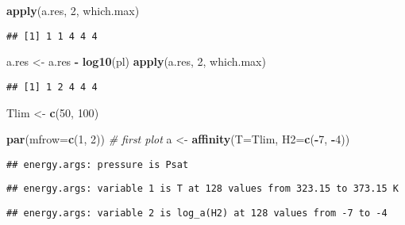 \documentclass[]{article}
\newenvironment{Shaded}{\begin{snugshade}}{\end{snugshade}}
\newcommand{\KeywordTok}[1]{\textcolor[rgb]{0.13,0.29,0.53}{\textbf{#1}}}
\newcommand{\DataTypeTok}[1]{\textcolor[rgb]{0.13,0.29,0.53}{#1}}
\newcommand{\DecValTok}[1]{\textcolor[rgb]{0.00,0.00,0.81}{#1}}
\newcommand{\StringTok}[1]{\textcolor[rgb]{0.31,0.60,0.02}{#1}}
\newcommand{\CommentTok}[1]{\textcolor[rgb]{0.56,0.35,0.01}{\textit{#1}}}
\newcommand{\OperatorTok}[1]{\textcolor[rgb]{0.81,0.36,0.00}{\textbf{#1}}}
\newcommand{\NormalTok}[1]{#1}
\begin{document}
\begin{Shaded}
\begin{Highlighting}[]
\KeywordTok{apply}\NormalTok{(a.res, }\DecValTok{2}\NormalTok{, which.max)}
\end{Highlighting}
\end{Shaded}

\begin{verbatim}
## [1] 1 1 4 4 4
\end{verbatim}

\begin{Shaded}
\begin{Highlighting}[]
\NormalTok{a.res <-}\StringTok{ }\NormalTok{a.res }\OperatorTok{-}\StringTok{ }\KeywordTok{log10}\NormalTok{(pl)}
\KeywordTok{apply}\NormalTok{(a.res, }\DecValTok{2}\NormalTok{, which.max)}
\end{Highlighting}
\end{Shaded}

\begin{verbatim}
## [1] 1 2 4 4 4
\end{verbatim}

\begin{Shaded}
\begin{Highlighting}[]
\NormalTok{Tlim <-}\StringTok{ }\KeywordTok{c}\NormalTok{(}\DecValTok{50}\NormalTok{, }\DecValTok{100}\NormalTok{)}
\end{Highlighting}
\end{Shaded}

\begin{Shaded}
\begin{Highlighting}[]
\KeywordTok{par}\NormalTok{(}\DataTypeTok{mfrow=}\KeywordTok{c}\NormalTok{(}\DecValTok{1}\NormalTok{, }\DecValTok{2}\NormalTok{))}
\CommentTok{# first plot}
\NormalTok{a <-}\StringTok{ }\KeywordTok{affinity}\NormalTok{(}\DataTypeTok{T=}\NormalTok{Tlim, }\DataTypeTok{H2=}\KeywordTok{c}\NormalTok{(}\OperatorTok{-}\DecValTok{7}\NormalTok{, }\OperatorTok{-}\DecValTok{4}\NormalTok{))}
\end{Highlighting}
\end{Shaded}

\begin{verbatim}
## energy.args: pressure is Psat
\end{verbatim}

\begin{verbatim}
## energy.args: variable 1 is T at 128 values from 323.15 to 373.15 K
\end{verbatim}

\begin{verbatim}
## energy.args: variable 2 is log_a(H2) at 128 values from -7 to -4
\end{verbatim}
\end{document}
